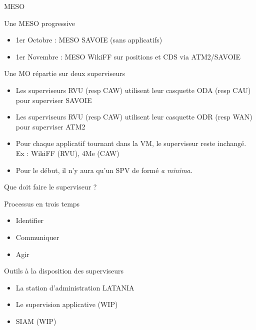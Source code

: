 \begin{frame}{MESO}
\begin{block}{Une MESO progressive}
\begin{itemize}
\item 1er Octobre : MESO SAVOIE (sans applicatifs)
\item 1er Novembre : MESO WikiFF sur positions et CDS via ATM2/SAVOIE
\end{itemize}
\end{block}
\begin{block}{Une MO répartie sur deux superviseurs}
\begin{itemize}
\item Les superviseurs RVU (resp CAW) utilisent leur casquette ODA (resp CAU) pour superviser SAVOIE
\item Les superviseurs RVU (resp CAW) utilisent leur casquette ODR (resp WAN) pour superviser ATM2
\item Pour chaque applicatif tournant dans la VM, le superviseur reste inchangé. Ex : WikiFF (RVU), 4Me (CAW)
\item Pour le début, il n'y aura qu'un SPV de formé \textit{a minima}. 
\end{itemize}
\end{block}
\end{frame}

\begin{frame}{Que doit faire le superviseur ?}
\begin{block}{Processus en trois temps}
\begin{itemize}
\item Identifier
\item Communiquer
\item Agir
\end{itemize}\pause
\end{block}
\begin{block}{Outils à la disposition des superviseurs}
\begin{itemize}
\item La station d'administration LATANIA
\item Le supervision applicative (WIP)
\item SIAM (WIP)
\end{itemize}
\end{block}
\end{frame}

